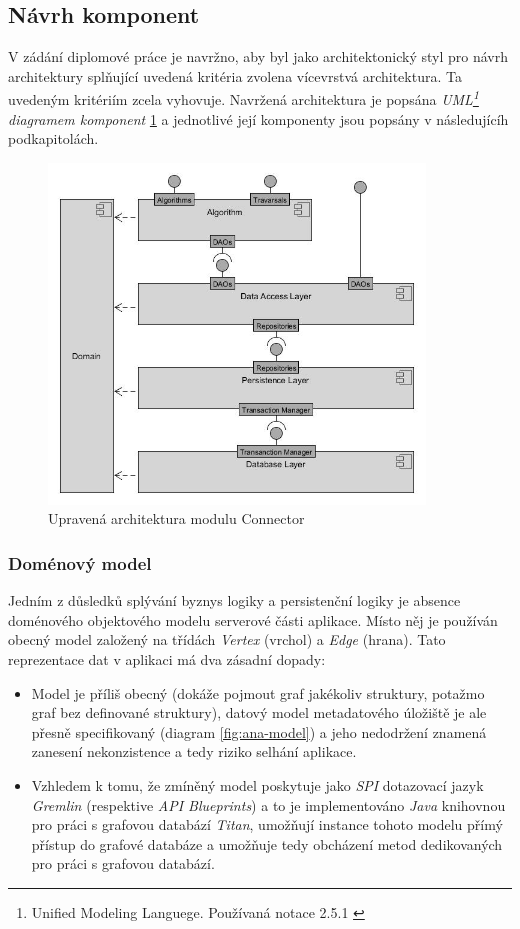 \subsection{Návrh komponent}
\label{sec:des_components}
V zádání diplomové práce je navržno, aby byl jako architektonický styl pro návrh architektury splňující uvedená kritéria zvolena vícevrstvá architektura. Ta uvedeným kritériím zcela vyhovuje. Navržená architektura je popsána \textit{UML\footnote{Unified Modeling Languege. Používaná notace 2.5.1 \cite{UML17}} diagramem komponent} \ref{fig:des-connector} a jednotlivé její komponenty jsou popsány v následujícíh podkapitolách.

\begin{figure}
\begin{center}
\includegraphics[width=10cm]{figures/connector_modules}
\caption{Upravená architektura modulu Connector}
\label{fig:des-connector}
\end{center}
\end{figure}

\subsubsection{Doménový model}
\label{sec:des_domain}
Jedním z důsledků splývání byznys logiky a persistenční logiky je absence doménového objektového modelu serverové části aplikace. Místo něj je používán obecný model založený na třídách \textit{Vertex} (vrchol) a \textit{Edge} (hrana). Tato reprezentace dat v aplikaci má dva zásadní dopady:

\begin{itemize}
   \item Model je příliš obecný (dokáže pojmout graf jakékoliv struktury, potažmo graf bez definované struktury), datový model metadatového úložiště je ale přesně specifikovaný (diagram \ref{fig:ana-model}) a jeho nedodržení znamená zanesení nekonzistence a tedy riziko selhání aplikace.
   \item Vzhledem k tomu, že zmíněný model poskytuje jako \textit{SPI} dotazovací jazyk \textit{Gremlin} (respektive \textit{API Blueprints}) a to je implementováno \textit{Java} knihovnou pro práci s grafovou databází \textit{Titan}, umožňují instance tohoto modelu přímý přístup do grafové databáze a umožňuje tedy obcházení metod dedikovaných pro práci s grafovou databází.
\end{itemize}

